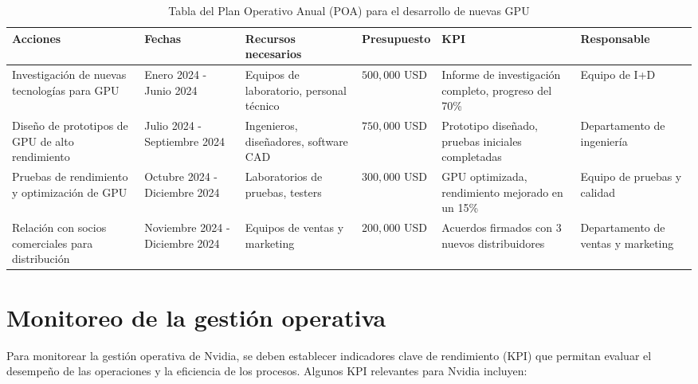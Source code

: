\documentclass{article}
\begin{document}
\begin{table}[ht]
\centering
\begin{tabularx}{\textwidth}{|X|X|X|X|X|X|} %
\hline
\textbf{Acciones} & \textbf{Fechas} & \textbf{Recursos necesarios} & \textbf{Presupuesto} & \textbf{KPI} & \textbf{Responsable} \\ \hline
Investigación de nuevas tecnologías para GPU & Enero 2024 - Junio 2024 & Equipos de laboratorio, personal técnico & $500,000$ USD & Informe de investigación completo, progreso del 70\% & Equipo de I+D \\ \hline
Diseño de prototipos de GPU de alto rendimiento & Julio 2024 - Septiembre 2024 & Ingenieros, diseñadores, software CAD & $750,000$ USD & Prototipo diseñado, pruebas iniciales completadas & Departamento de ingeniería \\ \hline
Pruebas de rendimiento y optimización de GPU & Octubre 2024 - Diciembre 2024 & Laboratorios de pruebas, testers & $300,000$ USD & GPU optimizada, rendimiento mejorado en un 15\% & Equipo de pruebas y calidad \\ \hline
Relación con socios comerciales para distribución & Noviembre 2024 - Diciembre 2024 & Equipos de ventas y marketing & $200,000$ USD & Acuerdos firmados con 3 nuevos distribuidores & Departamento de ventas y marketing \\ \hline
\end{tabularx}
\caption{Tabla del Plan Operativo Anual (POA) para el desarrollo de nuevas GPU}
\end{table}

\newpage

\section{Monitoreo de la gestión operativa}

Para monitorear la gestión operativa de Nvidia, se deben establecer indicadores clave de rendimiento (KPI) que permitan evaluar el desempeño de las operaciones y la eficiencia de los procesos. Algunos KPI relevantes para Nvidia incluyen:
\end{document}
